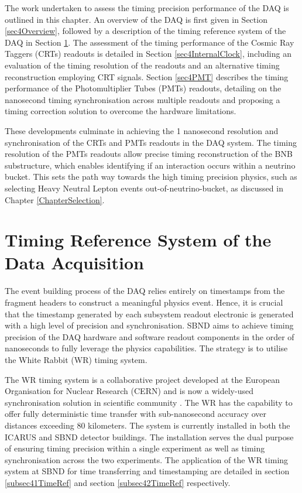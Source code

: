 The work undertaken to assess the timing precision performance of the DAQ is outlined in this chapter.
An overview of the DAQ is first given in Section \ref{sec4Overview}, followed by a description of the timing reference system of the DAQ in Section \ref{sec4TimeRef}. 
The assessment of the timing performance of the Cosmic Ray Taggers (CRTs) readouts is detailed in Section \ref{sec4InternalClock}, including an evaluation of the timing resolution of the readouts and an alternative timing reconstruction employing CRT signals. 
Section \ref{sec4PMT} describes the timing performance of the Photomultiplier Tubes (PMTs) readouts, detailing on the nanosecond timing synchronisation across multiple readouts and proposing a timing correction solution to overcome the hardware limitations. 

These developments culminate in achieving the 1 nanosecond resolution and synchronisation of the CRTs and PMTs readouts in the DAQ system. 
The timing resolution of the PMTs readouts allow precise timing reconstruction of the BNB substructure, which enables identifying if an interaction occurs within a neutrino bucket. 
This sets the path way towards the high timing precision physics, such as selecting Heavy Neutral Lepton events out-of-neutrino-bucket, as discussed in Chapter \ref{ChapterSelection}. 

\newpage

\section{Timing Reference System of the Data Acquisition}
\label{sec4TimeRef}

The event building process of the DAQ relies entirely on timestamps from the fragment headers to construct a meaningful physics event.
Hence, it is crucial that the timestamp generated by each subsystem readout electronic is generated with a high level of precision and synchronisation.
SBND aims to achieve timing precision of the DAQ hardware and software readout components in the order of nanoseconds to fully leverage the physics capabilities.
The strategy is to utilise the White Rabbit (WR) timing system.

The WR timing system is a collaborative project developed at the European Organisation for Nuclear Research (CERN) and is now a widely-used synchronisation solution in scientific community \cite{WR_paper}.
The WR has the capability to offer fully deterministic time transfer with sub-nanosecond accuracy over distances exceeding 80 kilometers.
The system is currently installed in both the ICARUS and SBND detector buildings.
The installation serves the dual purpose of ensuring timing precision within a single experiment as well as timing synchronisation across the two experiments. 
The application of the WR timing system at SBND for time transferring and timestamping are detailed in section \ref{subsec41TimeRef} and section \ref{subsec42TimeRef} respectively.

